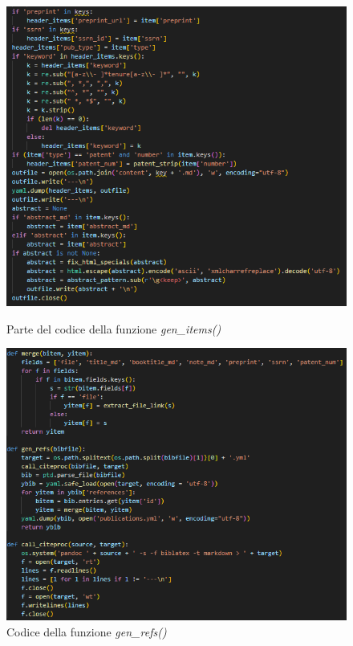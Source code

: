 \documentclass[target=bach,aauheader=]{thud}
\begin{document}
\begin{figure}
    \begin{minipage}{0.5\textwidth}
      \centering
      \includegraphics[width=1\textwidth]{images/gen-items-2.png}
      \caption{Parte del codice della funzione \textit{gen\_items()}}
      \label{img:genitems2}
    \end{minipage}
    \begin{minipage}{0.5\textwidth}
      \centering
      \includegraphics[width = 1.1\textwidth]{images/gen-refs.png}
      \caption{Codice della funzione \textit{gen\_refs()}} 
      \label{img:genrefs}
    \end{minipage}
\end{figure}
\end{document}

